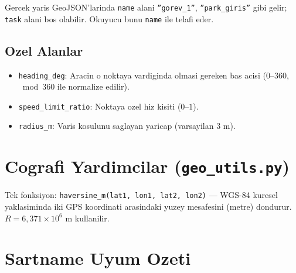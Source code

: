\documentclass[a4paper,12pt]{article}
\begin{document}
\begin{notebox}
Gercek yaris GeoJSON'larinda \texttt{name} alani
\texttt{''gorev\_1''}, \texttt{''park\_giris''} gibi gelir;
\texttt{task} alani bos olabilir. Okuyucu bunu \texttt{name} ile telafi eder.
\end{notebox}

\subsection{Ozel Alanlar}

\begin{itemize}
  \item \texttt{heading\_deg}: Aracin o noktaya vardiginda olmasi gereken
        bas acisi ($0$--$360$, $\bmod 360$ ile normalize edilir).
  \item \texttt{speed\_limit\_ratio}: Noktaya ozel hiz kisiti ($0$--$1$).
  \item \texttt{radius\_m}: Varis kosulunu saglayan yaricap (varsayilan 3 m).
\end{itemize}

\section{Cografi Yardimcilar (\texttt{geo\_utils.py})}

Tek fonksiyon: \texttt{haversine\_m(lat1, lon1, lat2, lon2)} ---
WGS-84 kuresel yaklasiminda iki GPS koordinati arasindaki yuzey
mesafesini (metre) dondurur. $R = 6{,}371 \times 10^6$ m kullanilir.

\section{Sartname Uyum Ozeti}
\end{document}
